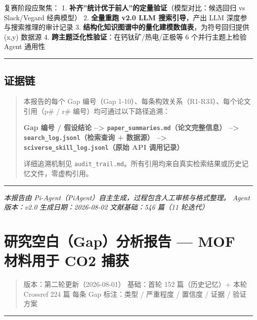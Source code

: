 \documentclass[12pt,a4paper]{ctexart}
\begin{document}
复赛阶段应聚焦： 1. \textbf{补齐''统计优于前人''的定量验证}（模型对比：候选回归 vs Slack/Vegard 经典模型） 2. \textbf{全量重跑 v2.0 LLM 搜索引导}，产出 LLM 深度参与搜索推理的审计记录 3. \textbf{结构化知识图谱中的量化建模数值表}，为符号回归提供 (x,y) 数据源 4. \textbf{跨主题泛化性验证}：在钙钛矿/热电/正极等 6 个并行主题上检验 Agent 通用性

\begin{center}\rule{0.5\linewidth}{0.5pt}\end{center}

\subsection{证据链}\label{ux8bc1ux636eux94fe}

\begin{quote}
本报告的每个 Gap 编号（Gap 1-10）、每条构效关系（R1-R33）、每个论文引用（p\# / r\# 编号）均可通过以下路径追溯：

\textbf{Gap 编号 / 假设结论 --\textgreater{} \texttt{paper\_summaries.md}（论文完整信息） --\textgreater{} \texttt{search\_log.jsonl}（检索查询 + 数据源） --\textgreater{} \texttt{sciverse\_skill\_log.jsonl}（原始 API 调用记录）}

详细追溯机制见 \texttt{audit\_trail.md}。所有引用均来自真实检索结果或历史记忆文件，零虚构引用。
\end{quote}

\begin{center}\rule{0.5\linewidth}{0.5pt}\end{center}

\emph{本报告由 Pi-Agent（PiAgent）自主生成，过程包含人工审核与格式整理。} \emph{Agent 版本：v2.0 \textbar{} 生成日期：2026-08-02 \textbar{} 文献基础：546 篇（11 轮迭代）}

\section{研究空白（Gap）分析报告 --- MOF 材料用于 CO2 捕获}\label{gap:ux7814ux7a76ux7a7aux767dgapux5206ux6790ux62a5ux544a-mof-ux6750ux6599ux7528ux4e8e-co2-ux6355ux83b7}

\begin{quote}
版本：第二轮更新（2026-08-01） 基础：首轮 152 篇（历史记忆）+ 本轮 Crossref 224 篇 每条 Gap 标注：类型 / 严重程度 / 置信度 / 证据 / 验证方案
\end{quote}

\begin{center}\rule{0.5\linewidth}{0.5pt}\end{center}
\end{document}
